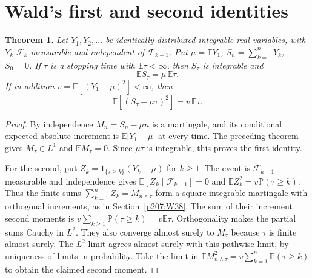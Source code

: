 \documentclass[11pt,oneside,openany]{book}
\theoremstyle{plain}
\newtheorem{theorem}{Theorem}[chapter]
\theoremstyle{definition}
\theoremstyle{remark}
\begin{document}
\section{Wald's first and second identities}\label{p207:W43}

\begin{theorem}
Let \(Y_1,Y_2,\ldots\) be identically distributed integrable real
variables, with \(Y_k\) \(\mathcal F_k\)-measurable and independent of
\(\mathcal F_{k-1}\). Put \(\mu=\mathbb E Y_1\),
\(S_n=\sum_{k=1}^nY_k\), \(S_0=0\). If \(\tau\) is a stopping time
with \(\mathbb E\tau<\infty\), then \(S_\tau\) is integrable and
\[
 \mathbb E S_\tau=\mu\,\mathbb E\tau.
\]
If in addition \(v=\mathbb E[(Y_1-\mu)^2]<\infty\), then
\[
  \mathbb E[(S_\tau-\mu\tau)^2]=v\,\mathbb E\tau.
\]
\end{theorem}
\begin{proof}
By independence \(M_n=S_n-\mu n\) is a martingale, and its
conditional expected absolute increment is
\(\mathbb E|Y_1-\mu|\) at every time. The preceding theorem
gives \(M_\tau\in L^1\) and \(\mathbb E M_\tau=0\).
Since \(\mu\tau\) is integrable, this proves the first identity.

For the second, put \(Z_k=1_{\{\tau\ge k\}}(Y_k-\mu)\) for \(k\ge1\).
The event is \(\mathcal F_{k-1}\)-measurable and independence gives
\(\mathbb E[Z_k\mid\mathcal F_{k-1}]=0\) and
\(\mathbb E Z_k^2=v\mathbb P(\tau\ge k)\).
Thus the finite sums \(\sum_{k=1}^n Z_k=M_{n\wedge\tau}\) form a
square-integrable martingale with orthogonal increments, as in
Section~\ref{p207:W38}. The sum of their increment second moments is
\(v\sum_{k\ge1}\mathbb P(\tau\ge k)=v\mathbb E\tau\).
Orthogonality makes the partial sums Cauchy in \(L^2\).
They also converge almost surely to \(M_\tau\) because \(\tau\)
is finite almost surely. The \(L^2\) limit agrees almost surely
with this pathwise limit, by uniqueness of limits in probability.
Take the limit in
\(\mathbb E M_{n\wedge\tau}^2=v\sum_{k=1}^n\mathbb P(\tau\ge k)\)
to obtain the claimed second moment.
\end{proof}
\end{document}
